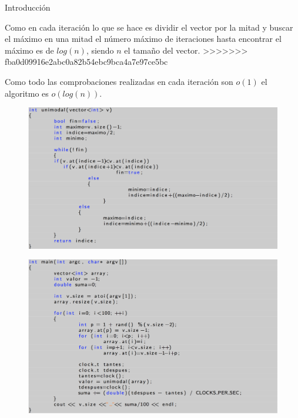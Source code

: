 \documentclass[12pt]{beamer}
\begin{document}
\begin{frame}{Introducción}
\begin{frame}
Como en cada iteración lo que se hace es dividir el vector por la mitad y buscar el máximo en una mitad el número máximo de iteraciones hasta encontrar el máximo es de $log(n)$, siendo $n$ el tamaño del vector. 
>>>>>>> fba0d09916e2abc0a82b54ebc9bca4a7e97ce5bc

\vspace{5mm} %

Como todo las comprobaciones realizadas en cada iteración son $o(1)$ el algoritmo es $o(log(n))$.
\end{frame}

\begin{frame}

\begin{figure}[H] 
\centering
\includegraphics[angle=0,scale=0.35]{img/1.png} 
\label{etiqueta} 
\end{figure}

\end{frame}

\begin{frame}

\begin{figure}[H] 
\centering
\includegraphics[angle=0,scale=0.35]{img/2.png} 
\label{etiqueta} 
\end{figure}


\end{frame}
\end{frame}
\end{document}

